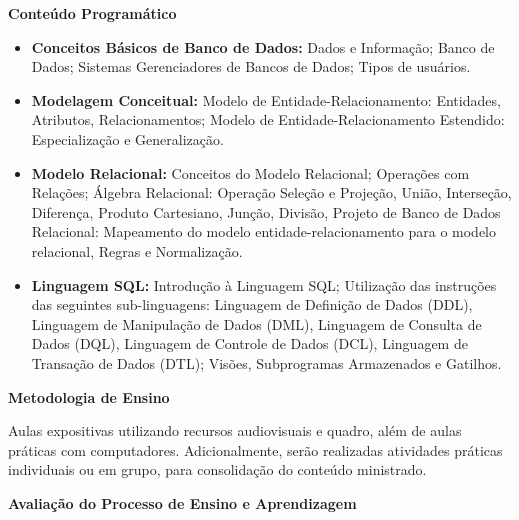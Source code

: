 
\begin{snugshade}\begin{center}\textbf{
    Conteúdo Programático
}\end{center}\end{snugshade}

\begin{itemize}

 \item \textbf{Conceitos Básicos de Banco de Dados:} Dados e Informação; Banco de Dados; Sistemas Gerenciadores de Bancos de Dados; Tipos de usuários.
 
 \item \textbf{Modelagem Conceitual:} Modelo de Entidade-Relacionamento: Entidades, Atributos, Relacionamentos; Modelo de Entidade-Relacionamento Estendido: Especialização e Generalização. 

 \item \textbf{Modelo Relacional:} Conceitos do Modelo Relacional; Operações com Relações; Álgebra Relacional: Operação Seleção e Projeção, União, Interseção, Diferença, Produto Cartesiano, Junção, Divisão, Projeto de Banco de Dados Relacional: Mapeamento do modelo entidade-relacionamento para o modelo relacional, Regras e Normalização.
 
 \item \textbf{Linguagem SQL:} Introdução à Linguagem SQL; Utilização das instruções das seguintes sub-linguagens: Linguagem de Definição de Dados (DDL), Linguagem de Manipulação de Dados (DML), Linguagem de Consulta de Dados (DQL), Linguagem de Controle de Dados (DCL), Linguagem de Transação de Dados (DTL); Visões, Subprogramas Armazenados e Gatilhos.

\end{itemize}

\begin{snugshade}\begin{center}\textbf{
    Metodologia de Ensino
}\end{center}\end{snugshade} 

\noindent
   Aulas expositivas utilizando recursos audiovisuais e quadro, além de aulas práticas com computadores. Adicionalmente, serão realizadas atividades práticas individuais ou em grupo, para consolidação do conteúdo ministrado.

\begin{snugshade}\begin{center}\textbf{
    Avaliação do Processo de Ensino e Aprendizagem
}\end{center}\end{snugshade}   

